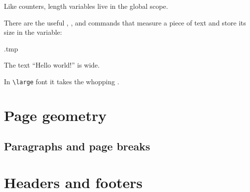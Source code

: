 \begin{technote}
Like counters, length variables live in the global scope.
\end{technote}

There are the useful , , and 
commands that measure a piece of text and store its size in the variable:
%
\begin{VerbatimOut}{\jobname.tmp}
\settowidth{}

The text ``Hello world!''
is {\the\Mylen} wide.

\settowidth{}

In \verb|\large| font it takes
the whopping \the\Mylen.
\end{VerbatimOut}
\ShowExample



%
%
%
\section{Page geometry}




%
%
\subsection{Paragraphs and page breaks}\label{sec:paragraph layout}




%
%
%
\section{Headers and footers}


